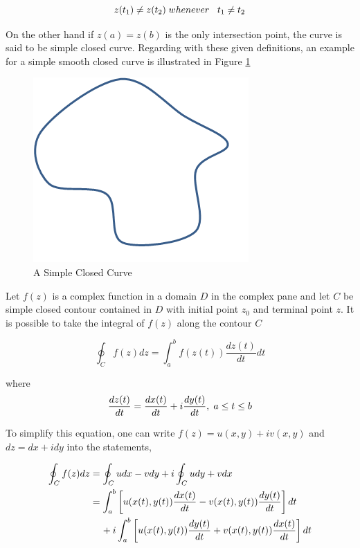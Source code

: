 \begin{equation} \label{crossitself}
z(t_1) \neq z(t_2)   \hspace{0.1cm} whenever   \hspace{0.3cm} t_1\neq t_2
\end{equation}
		
On the other hand if  $z(a)=z(b)$ is the only intersection point, the curve is said to be simple closed curve. Regarding with these given definitions, an example for a  simple smooth closed curve is illustrated in Figure \ref{simple_closed_curve_ref}

\begin{figure}[H]
\caption{A Simple Closed Curve} \label{simple_closed_curve_ref}
\centering
\includegraphics[scale = 0.60]{simple_closed_curve}
\end{figure}
		
Let $f(z)$ is a complex function in a domain $D$ in the complex pane and let $C$ be simple closed contour contained in $D$ with initial point $z_0$ and terminal point  $z$. It is possible to take the integral of $f(z)$ along the contour $C$
		
\begin{equation}
\oint_C f(z) dz = \int_{a}^{b} f(z(t))\frac{dz(t)}{dt} dt
\end{equation}
		
where
\begin{equation}
\frac{dz(t)}{dt} = \frac{dx(t)}{dt} + i\frac{dy(t)}{dt},   \hspace{0.1cm} a\leq t\leq b
\end{equation}
		
To simplify this equation, one can write $f(z) = u(x,y) + iv(x,y)$ and $dz = dx + idy$ into the statements,
		
\begin{align} \label{contour_integral}
\begin{split}
\oint_C f(z)dz & = \oint_C u dx - v dy + i \oint_C u dy + v dx \\
&= \int_{a}^{b}\left[u(x(t),y(t) )\frac{dx(t)}{dt} - v(x(t),y(t) )\frac{dy(t)}{dt}\right]dt\\
& \hspace{0.4cm} + i\int_{a}^{b} \left[u(x(t),y(t) )\frac{dy(t)}{dt} + v(x(t),y(t) )\frac{dx(t)}{dt}\right]dt
\end{split}
\end{align}

